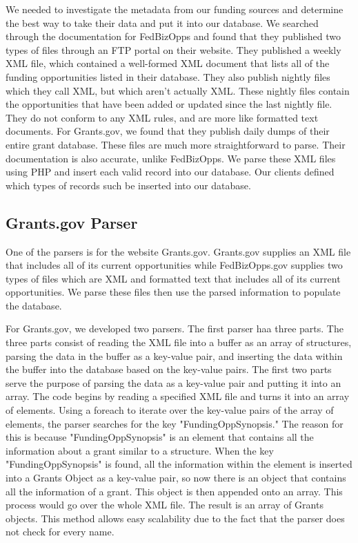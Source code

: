 \documentclass[onecolumn]{IEEEtran}
\begin{document}
We needed to investigate the metadata from our funding sources and determine the best way to take their data and put it into our database. We searched through the documentation for FedBizOpps and found that they published two types of files through an FTP portal on their website. They published a weekly XML file, which contained a well-formed XML document that lists all of the funding opportunities listed in their database. They also publish nightly files which they call XML, but which aren't actually XML. These nightly files contain the opportunities that have been added or updated since the last nightly file. They do not conform to any XML rules, and are more like formatted text documents. For Grants.gov, we found that they publish daily dumps of their entire grant database. These files are much more straightforward to parse. Their documentation is also accurate, unlike FedBizOpps. We parse these XML files using PHP and insert each valid record into our database. Our clients defined which types of records such be inserted into our database. 

\subsection{Grants.gov Parser}
One of the parsers is for the website Grants.gov. Grants.gov supplies an XML file that includes all of its current opportunities while FedBizOpps.gov supplies two types of files which are XML and formatted text that includes all of its current opportunities. We parse these files then use the parsed information to populate the database.  

For Grants.gov, we developed two parsers. The first parser haa three parts. The three parts consist of reading the XML file into a buffer as an array of structures, parsing the data in the buffer as a key-value pair, and inserting the data within the buffer into the database based on the key-value pairs. The first two parts serve the purpose of parsing the data as a key-value pair and putting it into an array. The code begins by reading a specified XML file and turns it into an array of elements. Using a foreach to iterate over the key-value pairs of the array of elements, the parser searches for the key "FundingOppSynopsis." The reason for this is because "FundingOppSynopsis" is an element that contains all the information about a grant similar to a structure. When the key "FundingOppSynopsis" is found, all the information within the element is inserted into a Grants Object as a key-value pair, so now there is an object that contains all the information of a grant. This object is then appended onto an array. This process would go over the whole XML file. The result is an array of Grants objects. This method allows easy scalability due to the fact that the parser does not check for every name. 
\end{document}

